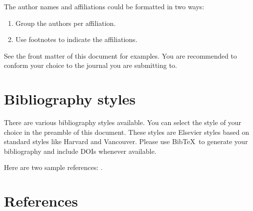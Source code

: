 \documentclass[review]{elsarticle}
\begin{document}
The author names and affiliations could be formatted in two ways:
\begin{enumerate}[(1)]
\item Group the authors per affiliation.
\item Use footnotes to indicate the affiliations.
\end{enumerate}
See the front matter of this document for examples. You are recommended to conform your choice to the journal you are submitting to.

\section{Bibliography styles}

There are various bibliography styles available. You can select the style of your choice in the preamble of this document. These styles are Elsevier styles based on standard styles like Harvard and Vancouver. Please use Bib\TeX\ to generate your bibliography and include DOIs whenever available.

Here are two sample references: \cite{Feynman1963118,Dirac1953888}.

\section*{References}


\end{document}
